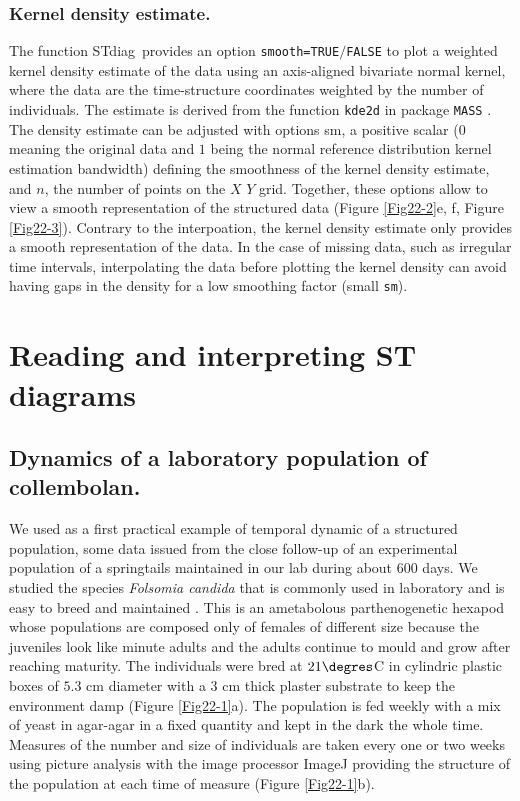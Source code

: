 \subsubsection{Kernel density estimate.}
The function STdiag~provides an option \texttt{smooth=TRUE}$/$\texttt{FALSE} to
plot a weighted kernel density estimate of the data using an axis-aligned bivariate normal
kernel, where the data are the time-structure coordinates weighted by the number
of individuals. The estimate is derived from the function \texttt{kde2d} in
package \texttt{MASS} \autocite{venables2002a}. The density estimate can be
adjusted with options sm, a positive scalar ($0$ meaning the original data and $1$ being
the normal reference distribution kernel estimation bandwidth) defining the smoothness of
the kernel density estimate, and $n$, the number of points on the $X$ $Y$ grid.
Together, these options allow to view a smooth representation of the structured
data (Figure \ref{Fig22-2}e, f, Figure \ref{Fig22-3}). Contrary to the interpoation, the kernel density
estimate only provides a smooth representation of the data. In the case of
missing data, such as irregular time intervals, interpolating the data before
plotting the kernel density can avoid having gaps in the density for a low
smoothing factor (small \texttt{sm}).

\section{Reading and interpreting ST diagrams}

\subsection{Dynamics of a laboratory population of collembolan.}
We used as a first practical example of temporal dynamic of a structured
population, some data issued from the close follow-up of an experimental
population of a springtails maintained in our lab during about $600$ days. We
studied the species \textit{Folsomia candida} that is commonly used in laboratory and is
easy to breed and maintained \autocite{fountain2005a}. This is
an ametabolous parthenogenetic hexapod whose populations are composed only of females of
different size because the juveniles look like minute adults and the adults
continue to mould and grow after reaching maturity. The individuals were bred at
$21 \degres$C in cylindric plastic boxes of $5.3$ cm diameter with a $3$ cm thick
plaster substrate to keep the environment damp \autocite{tully2008a} (Figure
\ref{Fig22-1}a). The population is fed weekly with a mix of yeast in agar-agar in a fixed quantity
and kept in the dark the whole time. Measures of the number and size of
individuals are taken every one or two weeks using picture analysis with the
image processor ImageJ \autocite{abramoff2004a,mallard2012a,mallard2013a}
providing the structure of the population at each time of measure (Figure \ref{Fig22-1}b).

